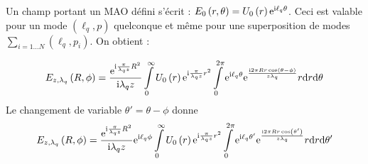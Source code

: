 Un champ portant un MAO défini s'écrit : ${E_0}\left( {r,\theta } \right) = {U_0}\left( r \right){\mathrm{e}^{\mathrm{i}{\ell _{q}}{\theta}}}$. Ceci est valable pour un mode $(\ell_q,p)$ quelconque et même pour une superposition de modes $\sum_{i=1\ldots N}(\ell_q,p_i)$. On obtient :

\begin{equation*}
	{E_{z,{\lambda _q}}}\left( {R,\phi } \right) = \frac{{{\mathrm{e}^{\mathrm{i}\frac{{\pi}}{{{\lambda _q}z}}{R^2}}}}}{{\mathrm{i}{\lambda _q}z}}\int \limits_0^\infty  {U_0}\left( r \right){\mathrm{e}^{\mathrm{i}\frac{{\pi }}{{{\lambda _q}z}}{r^2}}}
	\int \limits_0^{2{\pi }} {\mathrm{e}^{\mathrm{i}{\ell _{q}{\theta }}}{\mathrm{e}^{\frac{{ \mathrm{i} 2{\pi }Rr\cos \left( {\theta  - \phi } \right)}}{{z{\lambda _q}}}}}r{\mathrm{d}}r{\mathrm{d}}\theta}
\end{equation*}
Le changement de variable $\theta'=\theta-\phi$ donne
\begin{equation*}
	{E_{z,{\lambda _q}}}\left( {R,\phi } \right) = \frac{{{\mathrm{e}^{\mathrm{i}\frac{{\pi}}{{{\lambda _q}z}}{R^2}}}}}{{\mathrm{i}{\lambda _q}z}}
	\mathrm{e}^{\mathrm{i}{\ell _{q}{\phi}}}
	\int \limits_0^\infty  {U_0}\left( r \right){\mathrm{e}^{\mathrm{i}\frac{{\pi }}{{{\lambda _q}z}}{r^2}}}
	\int \limits_0^{2{\pi }} {\mathrm{e}^{\mathrm{i}{\ell _{q}{\theta' }}}{\mathrm{e}^{\frac{{ \mathrm{i} 2{\pi }Rr\cos \left( {\theta'} \right)}}{{z{\lambda _q}}}}}r{\mathrm{d}}r{\mathrm{d}}\theta'}
\end{equation*}

